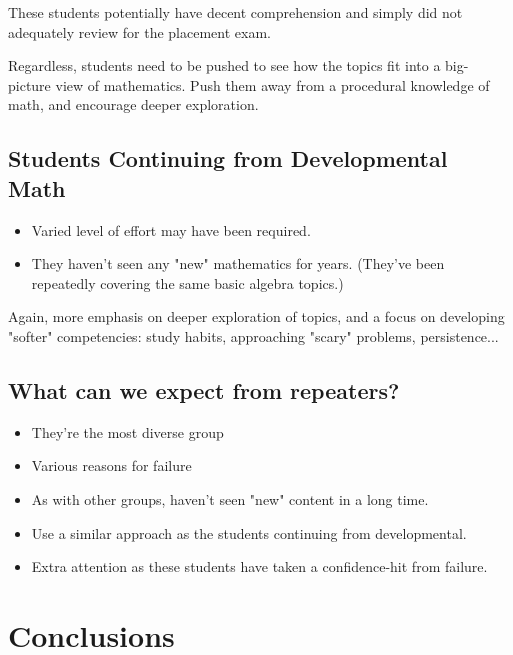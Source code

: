 \documentclass{ximera}
\begin{document}
\begin{corollary}
These students potentially have decent comprehension and simply did not 
adequately review for the placement exam. \\
\end{corollary}

Regardless, students need to be pushed to see how the topics fit into a big-
picture view of mathematics. Push them away from a procedural knowledge of
math, and encourage deeper exploration.\\

\subsection{Students Continuing from Developmental Math}

\begin{itemize}
\item Varied level of effort may have been required. 
\item They haven't seen any "new" mathematics for years. (They've been repeatedly covering the same basic algebra
topics.)
\end{itemize}

Again, more emphasis on deeper exploration of topics, and a focus on developing
"softer" competencies: study habits, approaching "scary" problems, persistence...\\


\subsection{What can we expect from repeaters?}

\begin{itemize}
\item They're the most diverse group
\item Various reasons for failure
\item As with other groups, haven't seen "new" content in a long time.
\item Use a similar approach as the students continuing from developmental.
\item Extra attention as these students have taken a confidence-hit from failure.
\end{itemize}

\section{Conclusions}
\end{document}
